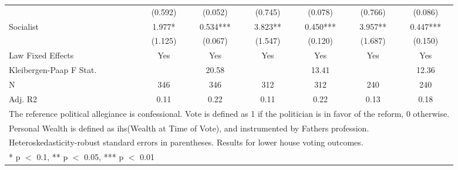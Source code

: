\begin{table}
\begin{tabular}[t]{lcccccc}
 & (\num{0.592}) & (\num{0.052}) & (\num{0.745}) & (\num{0.078}) & (\num{0.766}) & (\num{0.086})\\
Socialist & \num{1.977}* & \num{0.534}*** & \num{3.823}** & \num{0.450}*** & \num{3.957}** & \num{0.447}***\\
 & (\num{1.125}) & (\num{0.067}) & (\num{1.547}) & (\num{0.120}) & (\num{1.687}) & (\num{0.150})\\
\midrule
Law Fixed Effects & Yes & Yes & Yes & Yes & Yes & Yes\\
Kleibergen-Paap F Stat. &  & 20.58 &  & 13.41 &  & 12.36\\
N & \num{346} & \num{346} & \num{312} & \num{312} & \num{240} & \num{240}\\
Adj. R2 & \num{0.11} & \num{0.22} & \num{0.11} & \num{0.22} & \num{0.13} & \num{0.18}\\
\bottomrule
\multicolumn{7}{l}{\rule{0pt}{1em}The reference political allegiance is confessional. Vote is defined as 1 if the politician is in favor of the reform, 0 otherwise.}\\
\multicolumn{7}{l}{\rule{0pt}{1em}Personal Wealth is defined as ihs(Wealth at Time of Vote), and instrumented by Fathers profession.}\\
\multicolumn{7}{l}{\rule{0pt}{1em}Heteroskedasticity-robust standard errors in parentheses. Results for lower house voting outcomes.}\\
\multicolumn{7}{l}{\rule{0pt}{1em}* p $<$ 0.1, ** p $<$ 0.05, *** p $<$ 0.01}\\
\end{tabular}
\end{table}
